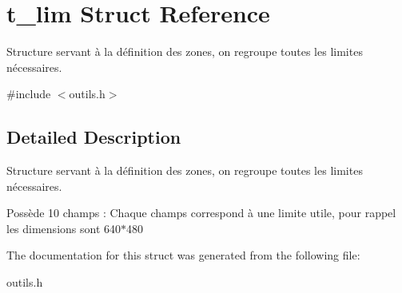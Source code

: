 \hypertarget{structt__lim}{}\section{t\+\_\+lim Struct Reference}
\label{structt__lim}


Structure servant à la définition des zones, on regroupe toutes les limites nécessaires.  




{\ttfamily \#include $<$outils.\+h$>$}



\subsection{Detailed Description}
Structure servant à la définition des zones, on regroupe toutes les limites nécessaires. 

Possède 10 champs \+: Chaque champs correspond à une limite utile, pour rappel les dimensions sont 640$\ast$480 

The documentation for this struct was generated from the following file\+:\begin{DoxyCompactItemize}
\item 
outils.\+h\end{DoxyCompactItemize}
